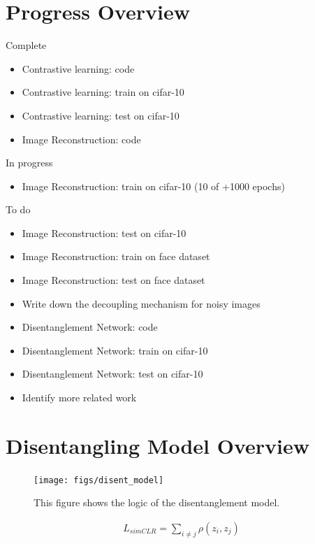 \documentclass[11pt]{article}
\begin{document}
\section{Progress Overview}

Complete

\begin{itemize}
\item Contrastive learning: code
\item Contrastive learning: train on cifar-10
\item Contrastive learning: test on cifar-10
\item Image Reconstruction: code
\end{itemize}

In progress

\begin{itemize}
\item Image Reconstruction: train on cifar-10  (10 of +1000 epochs)
\end{itemize}


To do

\begin{itemize}
\item Image Reconstruction: test on cifar-10
\item Image Reconstruction: train on face dataset
\item Image Reconstruction: test on face dataset
\item Write down the decoupling mechanism for noisy images
\item Disentanglement Network: code
\item Disentanglement Network: train on cifar-10
\item Disentanglement Network: test on cifar-10
\item Identify more related work
\end{itemize}

\section{Disentangling Model Overview}

\begin{figure}[h]
  \centering
  \texttt{[image: figs/disent\_model]}
  \caption{This figure shows the logic of the disentanglement model.}
\end{figure}

\begin{align}
  L_{simCLR} = \sum_{i \neq j} \rho(z_i,z_j)
\end{align}
\end{document}
